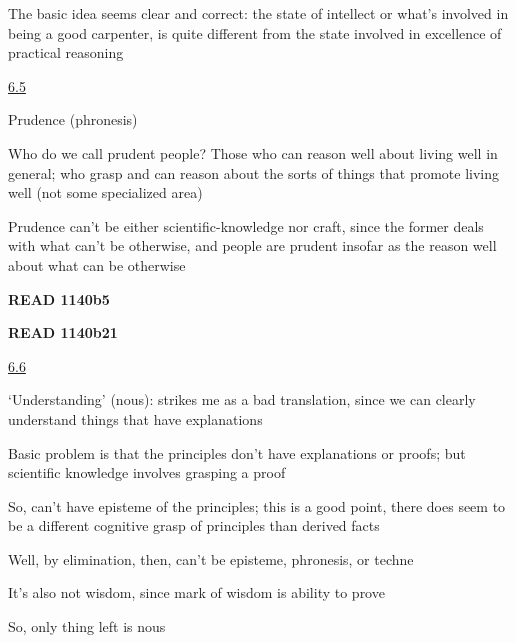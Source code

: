 \documentclass[11pt]{article}
\begin{document}
\noindent The basic idea seems clear and correct: the state of intellect or what's involved in being a good carpenter, is quite different from the state involved in excellence of practical reasoning
\vspace*{2mm}

\noindent\underline{6.5}
\vspace*{4mm}

\noindent Prudence (phronesis)
\vspace*{2mm}

\noindent Who do we call prudent people? Those who can reason well about living well in general; who grasp and can reason about the sorts of things that promote living well (not some specialized area)
\vspace*{2mm}

\noindent Prudence can't be either scientific-knowledge nor craft, since the former deals with what can't be otherwise, and people are prudent insofar as the reason well about what can be otherwise
\vspace*{2mm}

\noindent\textbf{READ 1140b5}
\vspace*{2mm}

\noindent\textbf{READ 1140b21}
\vspace*{2mm}

\noindent\underline{6.6}
\vspace*{4mm}

\noindent `Understanding' (nous): strikes me as a bad translation, since we can clearly understand things that have explanations
\vspace*{2mm}

\noindent Basic problem is that the principles don't have explanations or proofs; but scientific knowledge involves grasping a proof
\vspace*{2mm}

\noindent So, can't have episteme of the principles; this is a good point, there does seem to be a different cognitive grasp of principles than derived facts
\vspace*{2mm}

\noindent Well, by elimination, then, can't be episteme, phronesis, or techne
\vspace*{2mm}

\noindent It's also not wisdom, since mark of wisdom is ability to prove
\vspace*{2mm}

\noindent So, only thing left is nous
\vspace*{2mm}
\end{document}

